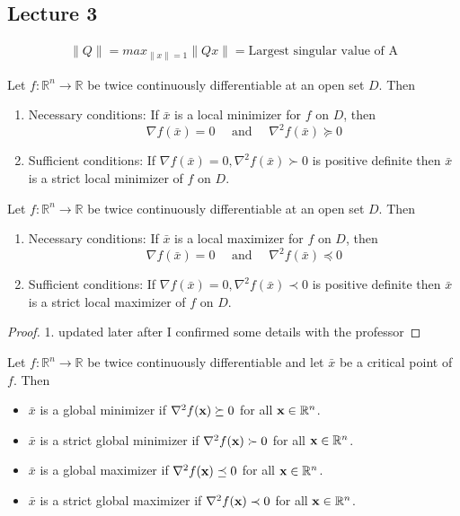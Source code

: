 
% 
\subsection{Lecture 3}

\begin{definition}
    \begin{align*}
        \|Q\|=max_{\|x\|=1}\|Qx\|= \text{Largest singular value of A}
    \end{align*}
\end{definition}

\begin{theorem}
  Let $f: \mathbb R^n \to \mathbb R$ be twice continuously differentiable at an open set $D$. Then
  \begin{enumerate}
    \item Necessary conditions: If $\bar{x}$ is a local minimizer for $f$ on $D$, then $$\nabla f(\bar{x})=0 \quad \text{ and } \quad \nabla^2f(\bar{x}) \succeq 0
    $$
    \item Sufficient conditions: If $\nabla f(\bar{x})=0,\nabla^2f(\bar{x}) \succ 0$ is positive definite then $\bar{x}$ is a strict local minimizer of $f$ on $D$.
  \end{enumerate}
\end{theorem}
\begin{theorem}
  Let $f: \mathbb R^n \to \mathbb R$ be twice continuously differentiable at an open set $D$. Then
  \begin{enumerate}
    \item Necessary conditions: If $\bar{x}$ is a local maximizer for $f$ on $D$, then $$\nabla f(\bar{x})=0 \quad \text{ and } \quad \nabla^2f(\bar{x}) \preceq 0
    $$
    \item Sufficient conditions: If $\nabla f(\bar{x})=0,\nabla^2f(\bar{x}) \prec 0$ is positive definite then $\bar{x}$ is a strict local maximizer of $f$ on $D$.
  \end{enumerate}
\end{theorem}
\begin{proof}
    1. updated later after I confirmed some details with the professor
\end{proof}
\begin{theorem}[]
  Let $f: \mathbb R^n \to \mathbb R$ be twice continuously differentiable and let $\bar{x}$ be a critical point of $f$. Then
  \begin{itemize}
    \item $\bar x$ is a global minimizer if $\nabla^2 f(\textbf{x}) \succeq 0$ for all $\textbf{x} \in \mathbb R^n$.
    \item $\bar x$ is a strict global minimizer if $\nabla^2 f(\textbf{x}) \succ 0$ for all $\textbf{x} \in \mathbb R^n$.
    \item $\bar x$ is a global maximizer if $\nabla^2 f(\textbf{x}) \preceq 0$ for all $\textbf{x} \in \mathbb R^n$.
    \item $\bar x$ is a strict global maximizer if $\nabla^2 f(\textbf{x}) \prec 0$ for all $\textbf{x} \in \mathbb R^n$.
  \end{itemize}
\end{theorem}

